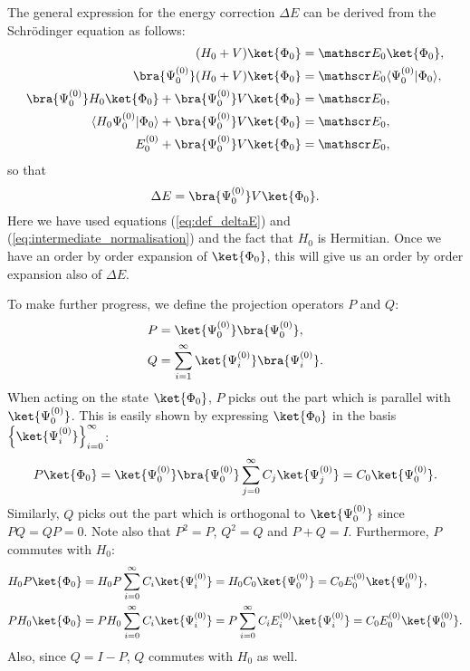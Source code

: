 The general expression for the energy correction $\Delta E$ can be derived from the Schrödinger equation as follows:
\begin{equation}
\begin{split}
 (H_0 + V)\ket{\Phi_0} & = \mathscr E_0\ket{\Phi_0}, \\
 \bra{\Psi^{(0)}_0}(H_0 + V)\ket{\Phi_0} & = \mathscr E_0\langle\Psi^{(0)}_0|\Phi_0\rangle, \\
 \bra{\Psi^{(0)}_0}H_0\ket{\Phi_0} + \bra{\Psi^{(0)}_0}V\ket{\Phi_0} & = \mathscr E_0, \\
 \langle H_0\Psi^{(0)}_0|\Phi_0\rangle + \bra{\Psi^{(0)}_0}V\ket{\Phi_0} & = \mathscr E_0, \\
 E^{(0)}_0 + \bra{\Psi^{(0)}_0}V\ket{\Phi_0} & = \mathscr E_0,
\end{split}
\end{equation}
so that
\begin{equation}
\label{eq:PT_DeltaE}
 \Delta E = \bra{\Psi^{(0)}_0}V\ket{\Phi_0}.
\end{equation}
Here we have used equations (\ref{eq:def_deltaE}) and (\ref{eq:intermediate_normalisation}) and the fact that $H_0$ is Hermitian.
Once we have an order by order expansion of $\ket{\Phi_0}$, this will give us an order by order expansion also of $\Delta E$.

To make further progress, we define the projection operators $P$ and $Q$:
\begin{align}
 P & = \ket{\Psi^{(0)}_0}\bra{\Psi^{(0)}_0}, \\
 Q & = \sum_{i=1}^\infty \ket{\Psi^{(0)}_i}\bra{\Psi^{(0)}_i}.
\end{align}
When acting on the state $\ket{\Phi_0}$, $P$ picks out the part which is parallel with $\ket{\Psi^{(0)}_0}$.
This is easily shown by expressing $\ket{\Phi_0}$ in the basis $\left\{\ket{\Psi^{(0)}_i}\right\}_{i=0}^\infty$:
\begin{equation}
 P\ket{\Phi_0} = \ket{\Psi^{(0)}_0}\bra{\Psi^{(0)}_0} \sum_{j=0}^\infty C_j\ket{\Psi^{(0)}_j} = C_0\ket{\Psi^{(0)}_0}.
\end{equation}
Similarly, $Q$ picks out the part which is orthogonal to $\ket{\Psi^{(0)}_0}$ since $PQ = QP = 0$. Note also that $P^2 = P$, $Q^2 = Q$ and $P+Q = I$.
Furthermore, $P$ commutes with $H_0$:
\begin{equation}
\begin{split}
 H_0 P \ket{\Phi_0} & = H_0 P \sum_{i=0}^\infty C_i \ket{\Psi^{(0)}_i} = H_0 C_0 \ket{\Psi^{(0)}_0} =  C_0 E^{(0)}_0 \ket{\Psi^{(0)}_0}, \\
 P H_0 \ket{\Phi_0} & = P H_0 \sum_{i=0}^\infty C_i \ket{\Psi^{(0)}_i} = P \sum_{i=0}^\infty C_i E^{(0)}_i \ket{\Psi^{(0)}_i} = C_0 E^{(0)}_0 \ket{\Psi^{(0)}_0}.
\end{split}
\end{equation}
Also, since $Q = I - P$, $Q$ commutes with $H_0$ as well.

